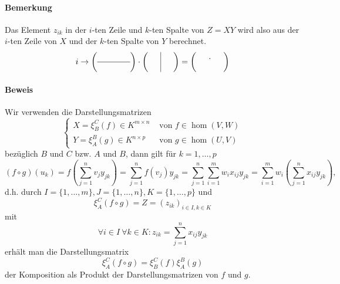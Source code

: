 \paragraph{Bemerkung}
	Das Element $ z_{ik} $ in der $ i $-ten Zeile und $ k $-ten Spalte von $ Z = XY $ wird also aus der $ i $-ten Zeile von $ X $ und der $k$-ten Spalte von $ Y $ berechnet.
	\begin{align*}
	    i\rightarrow
            \left(\begin{array}{cccc}
                &&&\\ 
                \hline
                &&&\\
            \end{array}\right)
            \cdot
            \left(\begin{array}{ccc}
                &\vline &\\
                &\vline &\\
            \end{array}\right)
            =
             \left(\begin{array}{ccc}
                & .&\\
                & &\\
            \end{array}\right)
	\end{align*}
\paragraph{Beweis}
	Wir verwenden die Darstellungsmatrizen
		\[ \begin{cases}
		X = \xi^C_B(f)\in K^{m\times n} &\text{ von } f\in \hom(V,W)\\
		Y = \xi_A^B(g)\in K^{n\times p} &\text{ von } g\in \hom(U,V)
		\end{cases} \]
	bezüglich $ B $ und $ C $ bzw. $ A $ und $ B $, dann gilt für $ k=1,\dots,p $
		\[ (f\circ g)(u_k)=f(\sum_{j=1}^{n}v_jy_{jk}) = \sum_{j=1}^{n}f(v_j)y_{jk} = \sum_{j=1}^{n}\sum_{i=1}^{m}w_ix_{ij}y_{jk} = \sum_{i=1}^{m}w_i\left(\sum_{j=1}^{n}x_{ij}y_{jk}\right), \]
	d.h. durch $ I=\{1,\dots,m\},J=\{1,\dots,n\},K=\{1,\dots,p\} $ und 
		\[ \xi_A^C(f\circ g) = Z = (z_{ik})_{i\in I,k\in K} \]
        mit
                \[ \forall i\in I\ \forall k\in K: z_{ik}= \sum_{j=1}^{n}x_{ij}y_{jk} \]
	erhält man die Darstellungsmatrix
		\[ \xi_A^C(f\circ g) = \xi_B^C(f)\xi_A^B(g) \]
	der Komposition als Produkt der Darstellungsmatrizen von $ f $ und $ g $.
